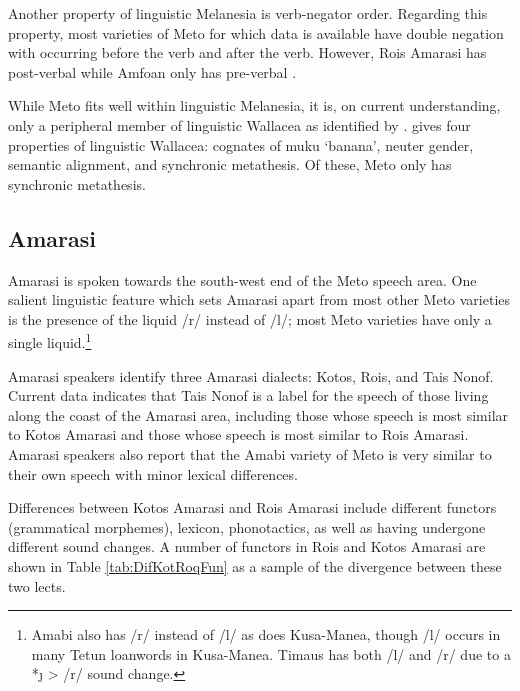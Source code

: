 Another property of linguistic Melanesia is verb-negator order.
Regarding this property, most varieties of Meto
for which data is available have double negation
with  occurring before the verb and  after the verb.
However, Ro{\Q}is Amarasi has post-verbal 
while Amfo{\Q}an only has pre-verbal .

While Meto fits well within linguistic Melanesia,
it is, on current understanding, only a peripheral
member of linguistic Wallacea as identified by \cite{sc15}.
\citeauthor{sc15} gives four properties of linguistic
Wallacea: cognates of \su{\#}muku `banana', neuter gender,
semantic alignment, and synchronic metathesis.
Of these, Meto only has synchronic metathesis.

\subsection{Amarasi}\label{sec:Amarasi}
Amarasi is spoken towards the south-west end of the Meto speech area.
One salient linguistic feature which sets Amarasi apart from most other Meto
varieties is the presence of the liquid /r/ instead of /l/;
most Meto varieties have only a single liquid.\footnote{
		Amabi also has /r/ instead of /l/ as does
		Kusa-Manea, though /l/ occurs in many Tetun loanwords in Kusa-Manea.
		Timaus has both /l/ and /r/ due to a *{\j} > /r/ sound change.}

Amarasi speakers identify three Amarasi dialects: Kotos, Ro{\Q}is, and Tais Nonof.
Current data indicates that Tais Nonof is a label for the speech of
those living along the coast of the Amarasi area,
including those whose speech is most similar to Kotos Amarasi
and those whose speech is most similar to Ro{\Q}is Amarasi.
Amarasi speakers also report that the Amabi variety of Meto
is very similar to their own speech with minor lexical differences.

Differences between Kotos Amarasi and Ro{\Q}is Amarasi
include different functors (grammatical morphemes),
lexicon, phonotactics, as well as having undergone different sound changes.
A number of functors in Ro{\Q}is and Kotos Amarasi
are shown in Table \ref{tab:DifKotRoqFun}
as a sample of the divergence between these two lects.

